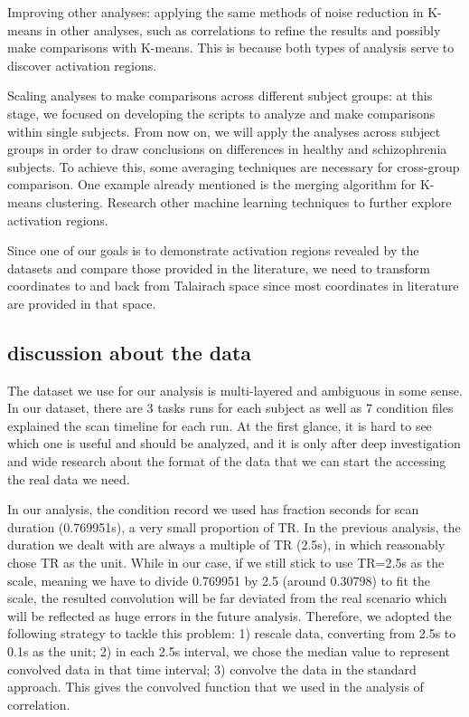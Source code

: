 \documentclass[11pt]{article}
\begin{document}
Improving other analyses: applying the same methods of noise reduction in
K-means in other analyses, 
such as correlations to refine the results and possibly make comparisons with
K-means. This is because both types of analysis serve to discover activation
regions. 

Scaling analyses to make comparisons across different subject groups: at this
stage, we focused on developing the scripts to analyze and make comparisons
within single subjects. From now on, we will apply the analyses across subject
groups in order to draw conclusions on differences in healthy and schizophrenia
subjects. To achieve this, some averaging techniques are necessary for
cross-group comparison. One example already mentioned is the merging algorithm
for K-means clustering. Research other machine learning techniques to further
explore activation regions.

Since one of our goals is to demonstrate activation regions revealed by the
datasets and compare those provided in the literature, we need to transform
coordinates to and back from Talairach space since most coordinates in
literature are provided in that space.

\subsection{discussion about the data}

The dataset we use for our analysis is multi-layered and ambiguous in some
sense. In our dataset, there are 3 tasks runs for each subject as well as 7
condition files explained the scan timeline for each run. At the first glance,
it is hard to see which one is useful and should be analyzed, and it is only
after deep investigation and wide research about the format of the data that we
can start the accessing the real data we need. 

In our analysis, the condition record we used has fraction seconds for scan
duration (0.769951s), a very small proportion of TR. In the previous analysis,
the duration we dealt with are always a multiple of TR (2.5s), in which
reasonably chose TR as the unit. While in our case, if we still stick to use
TR=2.5s as the scale, meaning we have to divide 0.769951 by 2.5 (around 0.30798)
to fit the scale, the resulted convolution will be far deviated from the real
scenario which will be reflected as huge errors in the future
analysis. Therefore, we adopted the following strategy to tackle this problem:
1) rescale data, converting from 2.5s to 0.1s as the unit; 2) in each 2.5s
interval, we chose the median value to represent convolved data in that time
interval; 3) convolve the data in the standard approach. This gives the
convolved function that we used in the analysis of correlation. 
\end{document}
